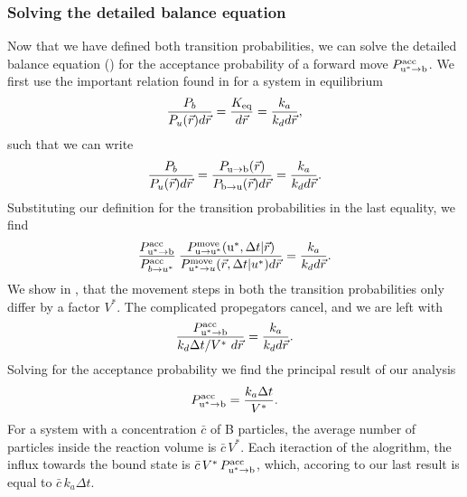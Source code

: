 \subsubsection{Solving the detailed balance equation}
Now that we have defined both transition probabilities, we can solve the detailed balance equation () for the acceptance probability of a forward move $P^{\rm acc}_{{\rm u}^* \to {\rm b}}$. We first use the important relation found in \cite{Morelli2008a} for a system in equilibrium
\begin{equation}
 \frac{P_b}{P_u(\vec{r})d\vec{r}} = \frac{K_{\rm eq}}{d\vec{r}} = \frac{k_a}{k_d d\vec{r}},
\end{equation}
such that we can write
\begin{equation}
 \frac{P_b}{P_u(\vec{r})d\vec{r}} = \frac{P_{ \rm{u} \to \rm{b} }(\vec{r})}{P_{ \rm{b} \to \rm{u} }(\vec{r})d\vec{r}} = \frac{k_a}{k_d d\vec{r}}.
\end{equation}
Substituting our definition for the transition probabilities in the last equality, we find
\begin{equation}
 \frac{P^{\rm acc}_{{\rm u}^* \to {\rm b}}}{P^{\rm acc}_{b \to u^*}} \: \frac{P^{\rm move}_{{\rm u} \to {\rm u}^*}({\rm u}^*,\Delta t|\vec{r})}{P^{\rm move}_{u^* \to u}(\vec{r},\Delta t|u^*)d\vec{r}} = \frac{k_a}{k_d d\vec{r}}.
\end{equation}
We show in , that the movement steps in both the transition probabilities only differ by a factor $V^*$. The complicated propegators cancel, and we are left with
\begin{equation}
 \frac{P^{\rm acc}_{{\rm u}^* \to {\rm b}}}{k_d \Delta t/V^* \,\, d\vec{r}} = \frac{k_a}{k_d d\vec{r}}.
\elabel{semi-pivotal}
\end{equation}
Solving for the acceptance probability we find the principal result of our analysis
\begin{equation}
 P^{\rm acc}_{{\rm u}^* \to {\rm b}} = \frac{k_a \Delta t}{V^*}.
\elabel{pivotal}
\end{equation}
For a system with a concentration $\bar{c}$ of B particles, the average number of particles inside the reaction volume is $\bar{c}\,V^*$. Each iteraction of the alogrithm, the influx towards the bound state is $\bar{c}\,V^*\,P^{\rm acc}_{{\rm u}^* \to {\rm b}}$, which, accoring to our last result is equal to $\bar{c}\,k_a \Delta t$. 

